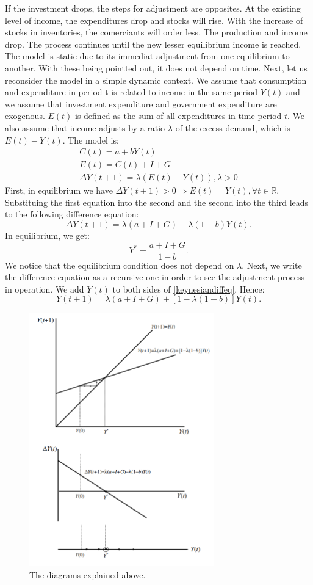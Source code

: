 \documentclass[a4paper,12pt]{report}
\newcommand{\R}{\mathbb{R}}
\begin{document}
If the investment drops, the steps for adjustment are opposites. At the existing level of income, the expenditures drop and stocks will rise. With the increase of stocks in inventories, the comerciants will order less. The production and income drop. The process continues until the new lesser equilibrium income is reached. The model is static due to its immediat adjustment from one equilibrium to another. With these being pointted out, it does not depend on time. Next, let us reconsider the model in a simple dynamic context. We assume that consumption and expenditure in period t is related to income in the same period $Y(t)$ and we assume that investment expenditure and government expenditure are exogenous. $E(t)$ is defined as the sum of all expenditures in time period $t$. We also assume that income adjusts by a ratio $\lambda$ of the excess demand, which is $E(t)-Y(t)$. The model is:
\begin{align*}
 C(t)=a+bY(t)\\
 E(t)=C(t)+I+G\\
 \Delta Y(t+1)=\lambda(E(t)-Y(t)), \lambda>0
\end{align*}
First, in equilibrium we have $\Delta Y(t+1)>0\Rightarrow E(t)=Y(t),\forall t\in\R$. Substituing the first equation into the second and the second into the third leads to the following difference equation:
\begin{equation}\label{keynesiandiffeq}
 \Delta Y(t+1)=\lambda(a+I+G)-\lambda(1-b)Y(t).
\end{equation}
In equilibrium, we get:
$$Y^{*}=\frac{a+I+G}{1-b}.$$
We notice that the equilibrium condition does not depend on $\lambda$. Next, we write the difference equation as a recursive one in order to see the adjustment process in operation. We add $Y(t)$ to both sides of \eqref{keynesiandiffeq}. Hence:
\begin{equation}
 Y(t+1)=\lambda(a+I+G)+[1-\lambda(1-b)]Y(t).
\end{equation}
\begin{figure}[h]
\caption{The diagrams explained above. \cite{shone}}
\centering
 \includegraphics[width=8cm]{keynesian.PNG}
 
\end{figure}
\end{document}
